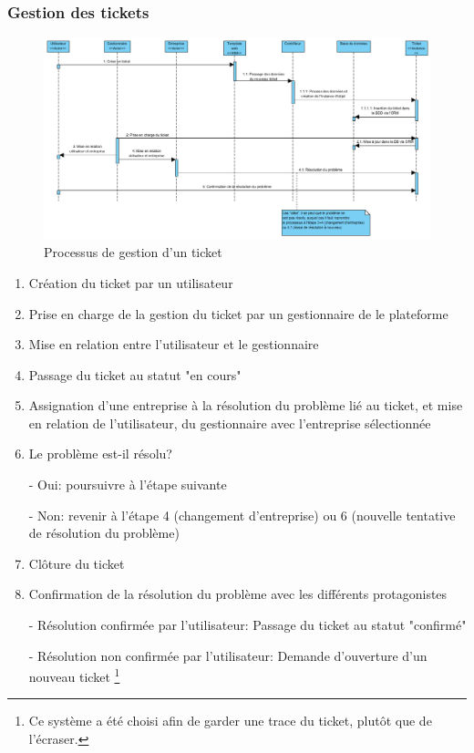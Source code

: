 \documentclass[12pt,table,a4paper]{report}
\begin{document}
\subsubsection{Gestion des tickets}

\begin{figure}
	\centering
		\includegraphics{images/schemas/processus_gestion_ticket.PNG}
	\caption{Processus de gestion d'un ticket}
	\label{fig:processus_gestion_ticket}
\end{figure}


\begin{enumerate}
	\item{Création du ticket par un utilisateur}
	\item{Prise en charge de la gestion du ticket par un gestionnaire de le plateforme}
	\item{Mise en relation entre l'utilisateur et le gestionnaire}
	\item{Passage du ticket au statut "en cours"}
	\item{Assignation d'une entreprise à la résolution du problème lié au ticket, et mise en relation de l'utilisateur, du gestionnaire avec l'entreprise sélectionnée}
	\item{Le problème est-il résolu?
	
	- Oui: poursuivre à l'étape suivante
	
	- Non: revenir à l'étape 4 (changement d'entreprise) ou 6 (nouvelle tentative de résolution du problème) 
	}
	\item{Clôture du ticket}
	\item{Confirmation de la résolution du problème avec les différents protagonistes
	
	- Résolution confirmée par l'utilisateur: Passage du ticket au statut "confirmé"
	
	- Résolution non confirmée par l'utilisateur: Demande d'ouverture d'un nouveau ticket \footnote{Ce système a été choisi afin de garder une trace du ticket, plutôt que de l'écraser.}
	}
\end{enumerate}
\end{document}
